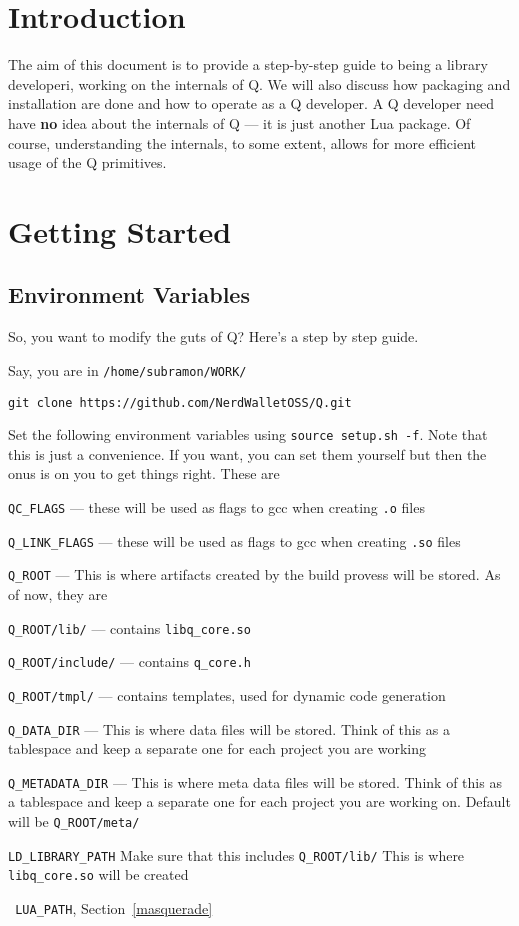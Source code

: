 
\section{Introduction}

The aim of this document is to provide a step-by-step guide to being a
library developeri, working on the internals of Q. We will also
discuss how packaging and installation are done and how to operate as
a Q developer. A Q developer need have {\bf no} idea about the
internals of Q --- it is just another Lua package. Of course,
understanding the internals, to some extent, allows for more efficient
usage of the Q primitives.

\section{Getting Started}
\label{getting_started}

\subsection{Environment Variables}
\label{env_var}
So, you want to modify the guts of Q? Here's a step by step guide.

\be
\item Say, you are in \verb+/home/subramon/WORK/+ 
\item \verb+git clone https://github.com/NerdWalletOSS/Q.git+
\item Set the following environment variables
using \verb+source setup.sh -f+. Note that this is just a convenience. If you
want, you can set them yourself but then the onus is on you to get things right.
These are
\be
\item \verb+QC_FLAGS+ --- these will be used as flags to gcc when creating
\verb+.o+ files
\item\verb+Q_LINK_FLAGS+ --- these will be used as flags to gcc when creating
\verb+.so+ files
\item \verb+Q_ROOT+ ---  This is where artifacts created by the build provess
will be stored. As of now, they are
\be
\item \verb+Q_ROOT/lib/+ --- contains \verb+libq_core.so+
\item \verb+Q_ROOT/include/+ --- contains \verb+q_core.h+
\item \verb+Q_ROOT/tmpl/+ --- contains templates, used for dynamic code
generation
\ee
\item \verb+Q_DATA_DIR+ --- This is where data files will be stored. Think of
this as a tablespace and keep a separate one for each project you are working
\item \verb+Q_METADATA_DIR+ --- This is where meta data files will be stored. Think of
this as a tablespace and keep a separate one for each project you are working
on. Default will be \verb+Q_ROOT/meta/+
\item 
\verb+LD_LIBRARY_PATH+ Make sure that this includes \verb+Q_ROOT/lib/+ This is
where \verb+libq_core.so+ will be created
\item \verb+ LUA_PATH+, Section~\ref{masquerade}
\ee
\ee

